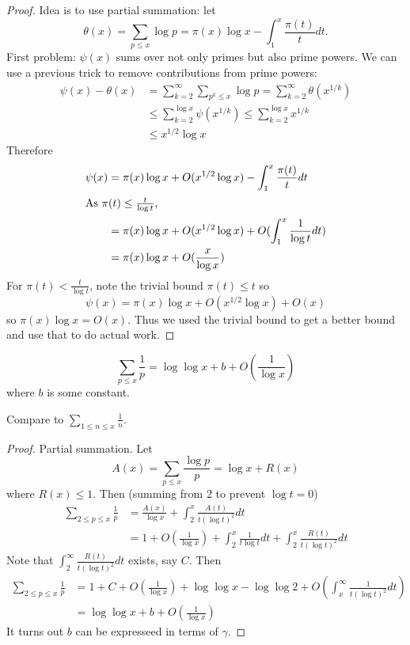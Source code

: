 \documentclass[a4paper]{article}
\begin{document}
\begin{proof}
  Idea is to use partial summation: let
  \[
    \theta(x)
    = \sum_{p \leq x} \log p
    = \pi(x) \log x - \int_1^x \frac{\pi(t)}{t} dt.
  \]
  First problem: \(\psi(x)\) sums over not only primes but also prime powers. We can use a previous trick to remove contributions from prime powers:
  \begin{align*}
    \psi(x) - \theta(x)
    &= \sum_{k = 2}^\infty \sum_{p^k \leq x} \log p
    = \sum_{k = 2}^\infty \theta(x^{1/k}) \\
    &\leq \sum_{k = 2}^{\log x} \psi(x^{1/k})
    \leq \sum_{k = 2}^{\log x} x^{1/k} \\
    &\leq x^{1/2} \log x
  \end{align*}
  Therefore
  \begin{align*}
    \psi(x)
    &= \pi(x) \log x + O(x^{1/2} \log x) - \int_1^x \frac{\pi(t)}{t} dt \\
    \intertext{As \(\pi(t) \leq \frac{t}{\log t}\),}
    &= \pi(x) \log x + O(x^{1/2} \log x) + O(\int_1^x \frac{1}{\log t} dt) \\
    &= \pi(x) \log x + O(\frac{x}{\log x})
  \end{align*}
  For \(\pi(t) < \frac{t}{\log t}\), note the trivial bound \(\pi(t) \leq t\) so
  \[
    \psi(x) = \pi(x) \log x + O(x^{1/2} \log x) + O(x)
  \]
  so \(\pi(x)\log x = O(x)\). Thus we used the trivial bound to get a better bound and use that to do actual work.
\end{proof}

\begin{lemma}
  \[
    \sum_{p \leq x} \frac{1}{p} = \log \log x + b + O(\frac{1}{\log x})
  \]
  where \(b\) is some constant.
\end{lemma}

Compare to \(\sum_{1 \leq n \leq x} \frac{1}{n}\).

\begin{proof}
  Partial summation. Let
  \[
    A(x) = \sum_{p \leq x} \frac{\log p}{p} = \log x + R(x)
  \]
  where \(R(x) \leq 1\). Then (summing from \(2\) to prevent \(\log t = 0\))
  \begin{align*}
    \sum_{2 \leq p \leq x} \frac{1}{p}
    &= \frac{A(x)}{\log x} + \int_2^x \frac{A(t)}{t (\log t)^2} dt \\
    &= 1 + O(\frac{1}{\log x}) + \int_2^x \frac{1}{t \log t} dt + \int_2^x \frac{R(t)}{t(\log t)^2} dt
  \end{align*}
  Note that \(\int_2^\infty \frac{R(t)}{t (\log t)^2} dt\) exists, say \(C\). Then
  \begin{align*}
    \sum_{2 \leq p \leq x} \frac{1}{p}
    &= 1 + C + O(\frac{1}{\log x}) + \log \log x - \log \log 2 + O(\int_x^\infty \frac{1}{t (\log t)^2} dt) \\
    &= \log \log x + b + O(\frac{1}{\log x})
  \end{align*}
  It turns out \(b\) can be expresseed in terms of \(\gamma\).
\end{proof}
\end{document}
